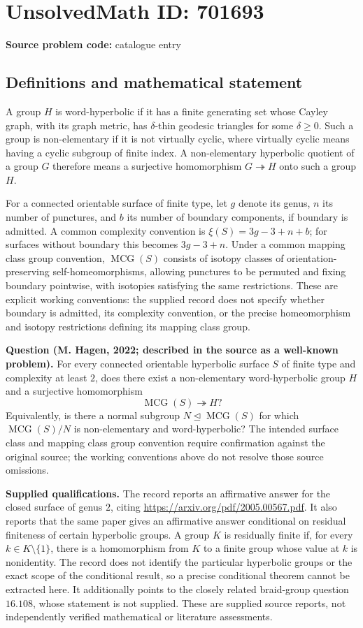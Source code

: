 \documentclass[11pt]{article}
\begin{document}
\section*{UnsolvedMath ID: 701693}
\textbf{Source problem code:} catalogue entry
\subsection{Definitions and mathematical statement}
A group \(H\) is word-hyperbolic if it has a finite generating set whose Cayley graph, with its graph metric, has \(\delta\)-thin geodesic triangles for some \(\delta\geq 0\). Such a group is non-elementary if it is not virtually cyclic, where virtually cyclic means having a cyclic subgroup of finite index. A non-elementary hyperbolic quotient of a group \(G\) therefore means a surjective homomorphism \(G\twoheadrightarrow H\) onto such a group \(H\).

For a connected orientable surface of finite type, let \(g\) denote its genus, \(n\) its number of punctures, and \(b\) its number of boundary components, if boundary is admitted. A common complexity convention is \(\xi(S)=3g-3+n+b\); for surfaces without boundary this becomes \(3g-3+n\). Under a common mapping class group convention, \(\operatorname{MCG}(S)\) consists of isotopy classes of orientation-preserving self-homeomorphisms, allowing punctures to be permuted and fixing boundary pointwise, with isotopies satisfying the same restrictions. These are explicit working conventions: the supplied record does not specify whether boundary is admitted, its complexity convention, or the precise homeomorphism and isotopy restrictions defining its mapping class group.

\textbf{Question (M. Hagen, 2022; described in the source as a well-known problem).} For every connected orientable hyperbolic surface \(S\) of finite type and complexity at least \(2\), does there exist a non-elementary word-hyperbolic group \(H\) and a surjective homomorphism
\[
\operatorname{MCG}(S)\twoheadrightarrow H?
\]
Equivalently, is there a normal subgroup \(N\trianglelefteq\operatorname{MCG}(S)\) for which \(\operatorname{MCG}(S)/N\) is non-elementary and word-hyperbolic? The intended surface class and mapping class group convention require confirmation against the original source; the working conventions above do not resolve those source omissions.

\textbf{Supplied qualifications.} The record reports an affirmative answer for the closed surface of genus \(2\), citing \url{https://arxiv.org/pdf/2005.00567.pdf}. It also reports that the same paper gives an affirmative answer conditional on residual finiteness of certain hyperbolic groups. A group \(K\) is residually finite if, for every \(k\in K\setminus\{1\}\), there is a homomorphism from \(K\) to a finite group whose value at \(k\) is nonidentity. The record does not identify the particular hyperbolic groups or the exact scope of the conditional result, so a precise conditional theorem cannot be extracted here. It additionally points to the closely related braid-group question \(16.108\), whose statement is not supplied. These are supplied source reports, not independently verified mathematical or literature assessments.
\end{document}
